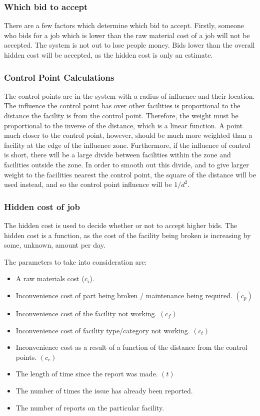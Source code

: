 \subsubsection{Which bid to accept}
There are a few factors which determine which bid to accept. Firstly, someone who bids for a job which is lower than the raw material cost of a job will not be accepted. The system is not out to lose people money. Bids lower than the overall hidden cost will be accepted, as the hidden cost is only an estimate.

\subsubsection*{Control Point Calculations}
The control points are in the system with a radius of influence and their location. The influence the control point has over other facilities is proportional to the distance the facility is from the control point. Therefore, the weight must be proportional to the inverse of the distance, which is a linear function. A point much closer to the control point, however, should be much more weighted than a facility at the edge of the influence zone. Furthermore, if the influence of control is short, there will be a large divide between facilities within the zone and facilities outside the zone. In order to smooth out this divide, and to give larger weight to the facilities nearest the control point, the square of the distance will be used instead, and so the control point influence will be $1/d^2$.

\subsubsection{Hidden cost of job}
\label{sec:hiddencost}
The hidden cost is used to decide whether or not to accept higher bids. The hidden cost is a function, as the cost of the facility being broken is increasing by some, unknown, amount per day.

The parameters to take into consideration are:
\begin{itemize}
\item A raw materials cost ($c_i$).
\item Inconvenience cost of part being broken / maintenance being required. $(c_p)$
\item Inconvenience cost of the facility not working. $(c_f)$
\item Inconvenience cost of facility type/category not working. $(c_t)$
\item Inconvenience cost as a result of a function of the distance from the control points. $(c_c)$
\item The length of time since the report was made. $(t)$
\item The number of times the issue has already been reported.
\item The number of reports on the particular facility.
\end{itemize}

